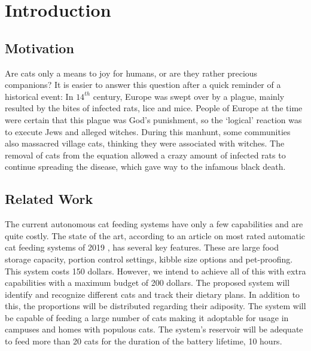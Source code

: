 
\section{Introduction} \label{sec:intro}
\subsection{Motivation}

Are cats only a means to joy for humans, or are they rather precious companions? It is easier to answer this question after a quick reminder of a historical event: In \(14^{th}\) century, Europe was swept over by a plague, mainly resulted by the bites of infected rats, lice and mice. People of Europe at the time were certain that this plague was God's punishment, so the `logical' reaction was to execute Jews and alleged witches. During this manhunt, some communities also massacred village cats, thinking they were associated with witches. The removal of cats from the equation allowed a crazy amount of infected rats to continue spreading the disease, which gave way to the infamous black death.





\subsection{Related Work}
The current autonomous cat feeding systems have only a few capabilities and are quite costly. The state of the art, according to an article on most rated automatic cat feeding systems of 2019 \cite{cite:SOTA}, has several key features. These are large food storage capacity, portion control settings, kibble size options and pet-proofing. This system costs 150 dollars. However, we intend to achieve all of this with extra capabilities with a maximum budget of 200 dollars. The proposed system will identify and recognize different cats and track their dietary plans. In addition to this, the proportions will be distributed regarding their adiposity. The system will be capable of feeding a large number of cats making it adoptable for usage in campuses and homes with populous cats. The system's reservoir will be adequate to feed more than 20 cats for the duration of the battery lifetime, 10 hours.

